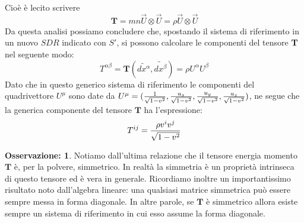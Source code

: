\documentclass[]{report}
\theoremstyle{definition}
\theoremstyle{Theorem}
\theoremstyle{definition}
\theoremstyle{definition}
\theoremstyle{definition}
\newtheorem{Obs}[Def]{Osservazione:}
\begin{document}
Cioè è lecito scrivere
$$\textbf{T}=mn\vec{U}\otimes\vec{U}=\rho\vec{U}\otimes\vec{U}$$
Da questa analisi possiamo concludere che, spostando il sistema di riferimento in un nuovo $SDR$ indicato con $S'$, si possono calcolare le componenti del tensore \textbf{T} nel seguente modo:
$$T^{\alpha\beta}=\textbf{T}(\tilde{dx^\alpha},\tilde{dx^\beta})=\rho U^\alpha U^\beta$$
Dato che in questo generico sistema di riferimento le componenti del quadrivettore $U^\mu$ sono date da $U^\mu=({1\over\sqrt{1-v^2}},{u_x\over\sqrt{1-v^2}},{u_y\over\sqrt{1-v^2}},{u_z\over\sqrt{1-v^2}})$, ne segue che la generica componente del tensore $\textbf{T}$ ha l'espressione:
$$T^{ij}={\rho v^iv^j\over \sqrt{1-v^2}}$$

\begin{Obs}
	Notiamo dall'ultima relazione che il tensore energia momento $\textbf{T}$ è, per la polvere, simmetrico. In realtà la simmetria è un proprietà intrinseca di questo tensore ed è vera in generale. Ricordiamo inoltre un importantissimo risultato noto dall'algebra lineare: una qualsiasi matrice simmetrica può essere sempre messa in forma diagonale. In altre parole, se $\textbf{T}$ è simmetrico allora esiste sempre un sistema di riferimento in cui esso assume la forma diagonale.
\end{Obs}
\end{document}
